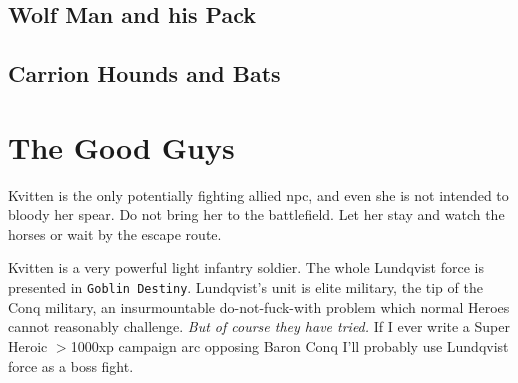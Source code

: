 \subsection*{Wolf Man and his Pack}
\label{sec:wolfmanstats}







\subsection*{Carrion Hounds and Bats}
\label{sec:carrionstats}





















\clearpage
{}
\section*{The Good Guys}

Kvitten is the only potentially fighting allied npc, and even she is not intended to bloody her spear. Do not bring her to the battlefield. Let her stay and watch the horses or wait by the escape route.

Kvitten is a very powerful light infantry soldier. The whole Lundqvist force is presented in \texttt{Goblin Destiny}. Lundqvist's unit is elite military, the tip of the Conq military, an insurmountable do-not-fuck-with problem which normal Heroes cannot reasonably challenge. \textit{But of course they have tried.}
If I ever write a Super Heroic $>$1000xp campaign arc opposing Baron Conq I'll probably use Lundqvist force as a boss fight.


